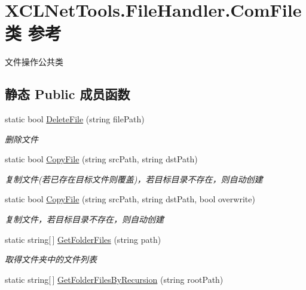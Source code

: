 \hypertarget{class_x_c_l_net_tools_1_1_file_handler_1_1_com_file}{\section{X\-C\-L\-Net\-Tools.\-File\-Handler.\-Com\-File类 参考}
\label{class_x_c_l_net_tools_1_1_file_handler_1_1_com_file}
}


文件操作公共类  


\subsection*{静态 Public 成员函数}
\begin{DoxyCompactItemize}
\item 
static bool \hyperlink{class_x_c_l_net_tools_1_1_file_handler_1_1_com_file_a7cc80f663aa1e69cf43af4a902243cc3}{Delete\-File} (string file\-Path)
\begin{DoxyCompactList}\small\item\em 删除文件 \end{DoxyCompactList}\item 
static bool \hyperlink{class_x_c_l_net_tools_1_1_file_handler_1_1_com_file_ae8479a1330655aa229ed6222410b7823}{Copy\-File} (string src\-Path, string dst\-Path)
\begin{DoxyCompactList}\small\item\em 复制文件(若已存在目标文件则覆盖)，若目标目录不存在，则自动创建 \end{DoxyCompactList}\item 
static bool \hyperlink{class_x_c_l_net_tools_1_1_file_handler_1_1_com_file_a1e917318b8b594c94d0fb50223f34648}{Copy\-File} (string src\-Path, string dst\-Path, bool overwrite)
\begin{DoxyCompactList}\small\item\em 复制文件，若目标目录不存在，则自动创建 \end{DoxyCompactList}\item 
static string\mbox{[}$\,$\mbox{]} \hyperlink{class_x_c_l_net_tools_1_1_file_handler_1_1_com_file_ae82ff285ff8d522f3d6096c26e70ce40}{Get\-Folder\-Files} (string path)
\begin{DoxyCompactList}\small\item\em 取得文件夹中的文件列表 \end{DoxyCompactList}\item 
static string\mbox{[}$\,$\mbox{]} \hyperlink{class_x_c_l_net_tools_1_1_file_handler_1_1_com_file_a674fdbb6dfba9453918df90642428caf}{Get\-Folder\-Files\-By\-Recursion} (string root\-Path)

\end{DoxyCompactItemize}
